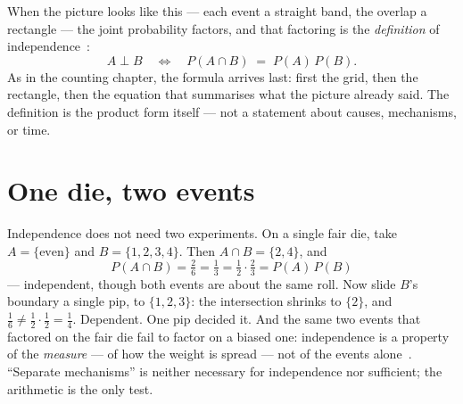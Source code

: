 \begin{narrative}
\begin{center}
\end{center}

When the picture looks like this — each event a straight band, the
overlap a rectangle — the joint probability factors, and that factoring
is the \emph{definition} of
independence~\cite{probability-wikipedia-independence-probability-theory}:
\[
  A \perp B
  \quad\Longleftrightarrow\quad
  P(A \cap B) \;=\; P(A)\,P(B).
\]
As in the counting chapter, the formula arrives last: first the grid,
then the rectangle, then the equation that summarises what the picture
already said. The definition is the product form itself — not a
statement about causes, mechanisms, or time.

\section{One die, two events}

Independence does not need two experiments. On a single fair die, take
$A = \{\text{even}\}$ and $B = \{1,2,3,4\}$. Then
$A \cap B = \{2,4\}$, and
\[
  P(A \cap B) = \tfrac{2}{6} = \tfrac13
  = \tfrac12 \cdot \tfrac23 = P(A)\,P(B)
\]
— independent, though both events are about the same roll. Now slide
$B$'s boundary a single pip, to $\{1,2,3\}$: the intersection shrinks to
$\{2\}$, and $\tfrac16 \neq \tfrac12 \cdot \tfrac12 = \tfrac14$.
Dependent. One pip decided it. And the same two events that factored on
the fair die fail to factor on a biased one: independence is a property
of the \emph{measure} — of how the weight is spread — not of the events
alone~\cite{probability-kevin-davisross-probability-and-simulation-3-5-independence}.
``Separate mechanisms'' is neither necessary for independence nor
sufficient; the arithmetic is the only test.


\end{narrative}

